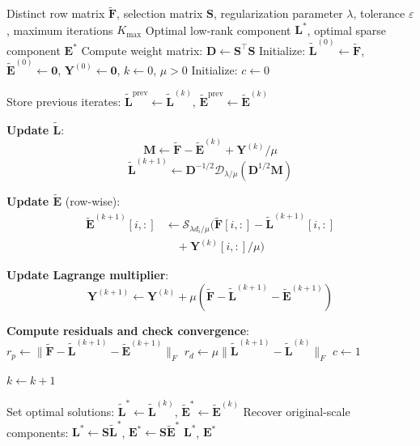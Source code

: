 \begin{algorithm}[tb]
\caption{Structured RPCA via Weighted Optimization}
\label{alg:structured_rpca}
\begin{algorithmic}[1]
\Require Distinct row matrix $\tilde{\mathbf{F}}$, selection matrix $\mathbf{S}$, regularization parameter $\lambda$, tolerance $\varepsilon$, maximum iterations $K_{\max}$
\Ensure Optimal low-rank component $\mathbf{L}^*$, optimal sparse component $\mathbf{E}^*$
\State Compute weight matrix: $\mathbf{D} \gets \mathbf{S}^\top \mathbf{S}$
\State Initialize: $\tilde{\mathbf{L}}^{(0)} \gets \tilde{\mathbf{F}}$, $\tilde{\mathbf{E}}^{(0)} \gets \mathbf{0}$, $\mathbf{Y}^{(0)} \gets \mathbf{0}$, $k \gets 0$, $\mu > 0$
\State Initialize: $c \gets 0$ 

    \State Store previous iterates: $\tilde{\mathbf{L}}^{\text{prev}} \gets \tilde{\mathbf{L}}^{(k)}$, $\tilde{\mathbf{E}}^{\text{prev}} \gets \tilde{\mathbf{E}}^{(k)}$
    
    \State \textbf{Update $\tilde{\mathbf{L}}$}:
    $$\mathbf{M} \gets \tilde{\mathbf{F}} - \tilde{\mathbf{E}}^{(k)} + \mathbf{Y}^{(k)}/\mu$$
    $$\tilde{\mathbf{L}}^{(k+1)} \gets \mathbf{D}^{-1/2} \mathcal{D}_{\lambda/\mu}\left(\mathbf{D}^{1/2} \mathbf{M}\right)$$
    
    \State \textbf{Update $\tilde{\mathbf{E}}$} (row-wise):
        $$\begin{aligned} \tilde{\mathbf{E}}^{(k+1)}[i,:] &\gets \mathcal{S}_{\lambda d_i/\mu}\bigl(\tilde{\mathbf{F}}[i,:] - \tilde{\mathbf{L}}^{(k+1)}[i,:] \\ &\quad + \mathbf{Y}^{(k)}[i,:]/\mu\bigr) \end{aligned}$$
    \EndFor
    
    \State \textbf{Update Lagrange multiplier}:
    \[
    \mathbf{Y}^{(k+1)} \gets \mathbf{Y}^{(k)} + \mu \left(\tilde{\mathbf{F}} - \tilde{\mathbf{L}}^{(k+1)} - \tilde{\mathbf{E}}^{(k+1)}\right)
    \]
    
    \State \textbf{Compute residuals and check convergence}:
    \State $r_p \gets \|\tilde{\mathbf{F}} - \tilde{\mathbf{L}}^{(k+1)} - \tilde{\mathbf{E}}^{(k+1)}\|_F$ 
    \State $r_d \gets \mu \|\tilde{\mathbf{L}}^{(k+1)} - \tilde{\mathbf{L}}^{(k)}\|_F$ 
        \State $c \gets 1$ 
    \EndIf
    
    \State $k \gets k + 1$
\EndWhile

\State Set optimal solutions: $\tilde{\mathbf{L}}^* \gets \tilde{\mathbf{L}}^{(k)}$, $\tilde{\mathbf{E}}^* \gets \tilde{\mathbf{E}}^{(k)}$
\State Recover original-scale components: $\mathbf{L}^* \gets \mathbf{S} \tilde{\mathbf{L}}^*$, $\mathbf{E}^* \gets \mathbf{S} \tilde{\mathbf{E}}^*$
\State \Return $\mathbf{L}^*$, $\mathbf{E}^*$
\end{algorithmic}
\end{algorithm}

